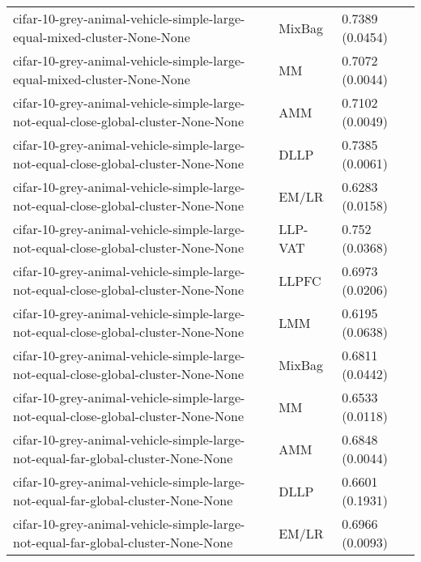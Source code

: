 \begin{longtable}{lll}
                                      cifar-10-grey-animal-vehicle-simple-large-equal-mixed-cluster-None-None &    MixBag &                       0.7389 (0.0454) \\
                                      cifar-10-grey-animal-vehicle-simple-large-equal-mixed-cluster-None-None &        MM &                       0.7072 (0.0044) \\
                           cifar-10-grey-animal-vehicle-simple-large-not-equal-close-global-cluster-None-None &       AMM &                       0.7102 (0.0049) \\
                           cifar-10-grey-animal-vehicle-simple-large-not-equal-close-global-cluster-None-None &      DLLP &                       0.7385 (0.0061) \\
                           cifar-10-grey-animal-vehicle-simple-large-not-equal-close-global-cluster-None-None &     EM/LR &                       0.6283 (0.0158) \\
                           cifar-10-grey-animal-vehicle-simple-large-not-equal-close-global-cluster-None-None &   LLP-VAT &                        0.752 (0.0368) \\
                           cifar-10-grey-animal-vehicle-simple-large-not-equal-close-global-cluster-None-None &     LLPFC &                       0.6973 (0.0206) \\
                           cifar-10-grey-animal-vehicle-simple-large-not-equal-close-global-cluster-None-None &       LMM &                       0.6195 (0.0638) \\
                           cifar-10-grey-animal-vehicle-simple-large-not-equal-close-global-cluster-None-None &    MixBag &                       0.6811 (0.0442) \\
                           cifar-10-grey-animal-vehicle-simple-large-not-equal-close-global-cluster-None-None &        MM &                       0.6533 (0.0118) \\
                             cifar-10-grey-animal-vehicle-simple-large-not-equal-far-global-cluster-None-None &       AMM &                       0.6848 (0.0044) \\
                             cifar-10-grey-animal-vehicle-simple-large-not-equal-far-global-cluster-None-None &      DLLP &                       0.6601 (0.1931) \\
                             cifar-10-grey-animal-vehicle-simple-large-not-equal-far-global-cluster-None-None &     EM/LR &                       0.6966 (0.0093) \\

\end{longtable}
